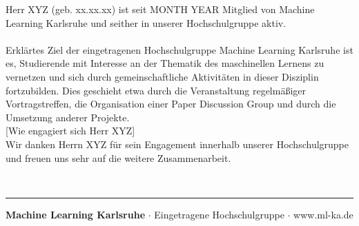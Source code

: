 \documentclass[12pt, a4paper]{article}
\date{}
\title{\flushleft{\textbf{Bescheinigung über Mitgliedschaft \protect\\ und  Engagement}}}
\begin{document}
\maketitle
\thispagestyle{fancy}
Herr XYZ (geb. xx.xx.xx) ist seit MONTH YEAR Mitglied von Machine Learning Karlsruhe und seither in unserer Hochschulgruppe aktiv.\\\\
Erklärtes Ziel der eingetragenen Hochschulgruppe Machine Learning Karlsruhe ist es, Studierende mit Interesse an der Thematik des maschinellen Lernens zu vernetzen und sich durch gemeinschaftliche Aktivitäten in dieser Disziplin fortzubilden.
Dies geschieht etwa durch die Veranstaltung regelmäßiger Vortragstreffen, die Organisation einer Paper Discussion Group und durch die Umsetzung anderer Projekte.\\

[Wie engagiert sich Herr XYZ]
\\

Wir danken Herrn XYZ für sein Engagement innerhalb unserer Hochschulgruppe und freuen uns sehr auf die weitere Zusammenarbeit.
\vfill
        \par\noindent\makebox[2.0in]{\hrulefill} \hfill\makebox[2.0in]{\hrulefill}%
        \par\noindent{}      \hfill{}%
\\
\noindent\rule{\textwidth}{1pt}
\begin{center}
{\small \textbf{Machine Learning Karlsruhe} $\cdot$ Eingetragene Hochschulgruppe $\cdot$ www.ml-ka.de}\\[0.5\baselineskip]
\end{center}
    
\end{document}
